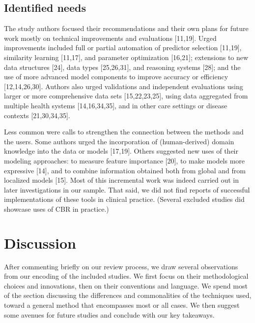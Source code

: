 \documentclass[preprint, 3p,
authoryear]{elsarticle} %
\begin{document}
\hypertarget{identified-needs}{%
\subsection{Identified needs}\label{identified-needs}}

The study authors focused their recommendations and their own plans for
future work mostly on technical improvements and evaluations
{[}11,19{]}. Urged improvements included full or partial automation of
predictor selection {[}11,19{]}, similarity learning {[}11,17{]}, and
parameter optimization {[}16,21{]}; extensions to new data structures
{[}24{]}, data types {[}25,26,31{]}, and reasoning systems {[}28{]}; and
the use of more advanced model components to improve accuracy or
efficiency {[}12,14,26,30{]}. Authors also urged validations and
independent evaluations using larger or more comprehensive data sets
{[}15,22,23,25{]}, using data aggregated from multiple health systems
{[}14,16,34,35{]}, and in other care settings or disease contexts
{[}21,30,34,35{]}.

Less common were calls to strengthen the connection between the methods
and the users. Some authors urged the incorporation of (human-derived)
domain knowledge into the data or models {[}17,19{]}. Others suggested
new uses of their modeling approaches: to measure feature importance
{[}20{]}, to make models more expressive {[}14{]}, and to combine
information obtained both from global and from localized models
{[}15{]}. Most of this incremental work was indeed carried out in later
investigations in our sample. That said, we did not find reports of
successful implementations of these tools in clinical practice. (Several
excluded studies did showcase uses of CBR in practice.)

\hypertarget{discussion}{%
\section{Discussion}\label{discussion}}

After commenting briefly on our review process, we draw several
observations from our encoding of the included studies. We first focus
on their methodological choices and innovations, then on their
conventions and language. We spend most of the section discussing the
differences and commonalities of the techniques used, toward a general
method that encompasses most or all cases. We then suggest some avenues
for future studies and conclude with our key takeaways.
\end{document}

